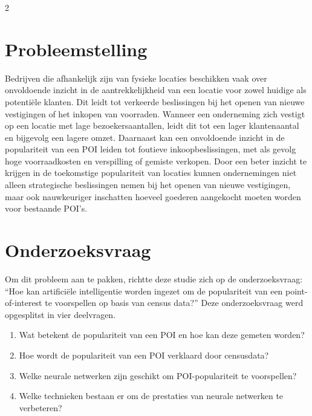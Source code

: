 \documentclass[a0,portrait]{hogent-poster}
\begin{document}
\begin{multicols}{2} %

\section{Probleemstelling}

Bedrijven die afhankelijk zijn van fysieke locaties beschikken vaak over onvoldoende inzicht in de aantrekkelijkheid van een locatie voor zowel huidige als potentiële klanten. Dit leidt tot verkeerde beslissingen bij het openen van nieuwe vestigingen of het inkopen van voorraden. Wanneer een onderneming zich vestigt op een locatie met lage bezoekersaantallen, leidt dit tot een lager klantenaantal en bijgevolg een lagere omzet. Daarnaast kan een onvoldoende inzicht in de populariteit van een POI leiden tot foutieve inkoopbeslissingen, met als gevolg hoge voorraadkosten en verspilling of gemiste verkopen. Door een beter inzicht te krijgen in de toekomstige populariteit van locaties kunnen ondernemingen niet alleen strategische beslissingen nemen bij het openen van nieuwe vestigingen, maar ook nauwkeuriger inschatten hoeveel goederen aangekocht moeten worden voor bestaande POI’s.

\section{Onderzoeksvraag}

Om dit probleem aan te pakken, richtte deze studie zich op de onderzoeksvraag: “Hoe kan artificiële intelligentie worden ingezet om de populariteit van een point-of-interest te voorspellen op basis van census data?” Deze onderzoeksvraag werd opgesplitst in vier deelvragen.

\vspace{5mm}

\begin{enumerate}
    \item Wat betekent de populariteit van een POI en hoe kan deze gemeten worden?
    \item Hoe wordt de populariteit van een POI verklaard door censusdata?
    \item Welke neurale netwerken zijn geschikt om POI-populariteit te voorspellen?
    \item Welke technieken bestaan er om de prestaties van neurale netwerken te verbeteren?
\end{enumerate}


\end{multicols}
\end{document}
